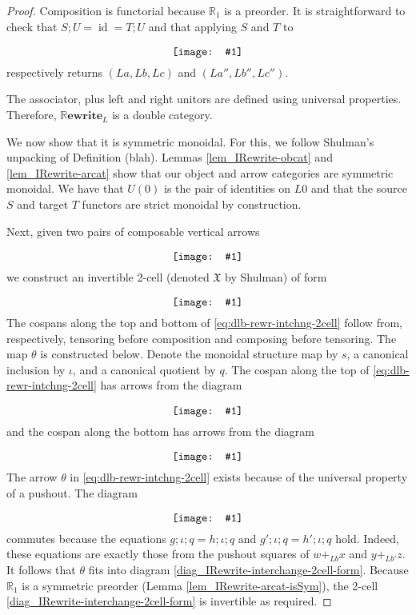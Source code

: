 \documentclass{amsart}
\newcommand{\RR}{\mathbb{R}}
\newcommand{\diagram}[1]{\raisebox{-0.5\height}{\texttt{[image: \#1]}}}
\newcommand{\RRewrite}{ \mathbb{R}\mathbf{ewrite} }
\newcommand{\edit}[1]{\textcolor{editcolour}{(#1)}}
\DeclareMathOperator{\id}{id}
\theoremstyle{remark}
\theoremstyle{definition}
\begin{document}
\begin{proof}
  Composition is functorial because $ \RR_1 $ is a preorder. It is
  straightforward to check that $ S;U = \id = T;U$ and that applying
  $ S $ and $ T $ to
  \[
    \diagram{diag_nlr_dbl-rewrite-deconstructed-composite}
  \]
  respectively returns \( ( La , Lb , Lc ) \) and \( ( La'' , Lb'' ,
  Lc'' ) \).
  
  The associator, plus left and right unitors are defined using
  universal properties. Therefore, $ \RRewrite_L $ is a double
  category.
	
  We now show that it is symmetric monoidal.  For this, we follow
  Shulman's unpacking of Definition \edit{blah}.  
  Lemmas \ref{lem_IRewrite-obcat} and \ref{lem_IRewrite-arcat} show
  that our object and arrow categories are symmetric monoidal.  We
  have that $ U ( 0 ) $ is the pair of identities on $ L 0 $ and that
  the source $ S $ and target $ T $ functors are strict monoidal by
  construction.
	
  Next, given two pairs of composable vertical arrows
  \[
    \diagram{diag_nlr_dbl-rewrite-interchange}
  \]
  we construct an invertible 2-cell (denoted $ \mathfrak{X} $ by
  Shulman) of form
  \begin{equation} \label{eq:dlb-rewr-intchng-2cell}
    \diagram{diag_nlr_dbl-rewrite-interchange-2cell}
  \end{equation}
  The cospans along the top and bottom of
  \eqref{eq:dlb-rewr-intchng-2cell} follow from, respectively,
  tensoring before composition and composing before tensoring. The map
  $ \theta $ is constructed below. Denote the monoidal structure map
  by $ s $, a canonical inclusion by $ \iota $, and a canonical
  quotient by $ q $.  The cospan along the top of
  \eqref{eq:dlb-rewr-intchng-2cell} has arrows from the diagram
  \[
    \diagram{diag_nlr_dbl-rewrite-tensor-compose}
  \]
  and the cospan along the bottom has arrows from the diagram
  \[
    \diagram{diag_nlr_dbl-rewrite-compose-tensor}
  \]
  The arrow $ \theta $ in \eqref{eq:dlb-rewr-intchng-2cell} exists
  because of the universal property of a pushout.  The diagram
  \[
    \diagram{diag_nlr_dbl-rewrite-pushout-competetor}
  \]
  commutes because the equations $ g ; \iota ; q = h ; \iota ; q $ and
  $ g' ; \iota ; q = h' ; \iota ; q $ hold.  Indeed, these equations
  are exactly those from the pushout squares of $ w +_{Lb} x $ and
  $ y +_{Lb'} z $.  It follows that $ \theta $ fits into diagram
  \eqref{diag_IRewrite-interchange-2cell-form}. Because $ \RR_1 $ is a
  symmetric preorder (Lemma \ref{lem_IRewrite-arcat-isSym}), the
  2-cell \eqref{diag_IRewrite-interchange-2cell-form} is invertible as
  required.
	

\end{proof}
\end{document}
